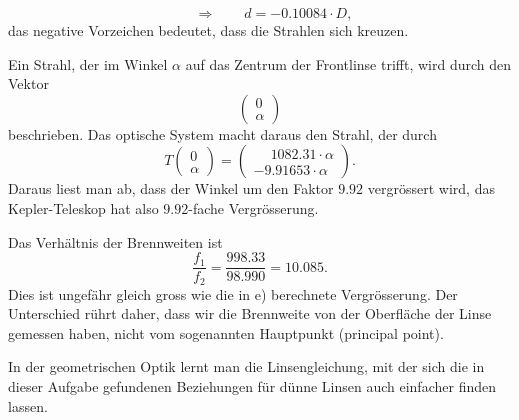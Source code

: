\begin{loesung}
\begin{teilaufgaben}
\[\qquad\Rightarrow\qquad
d = -0.10084\cdot D,
\]
das negative Vorzeichen bedeutet, dass die Strahlen sich kreuzen.
\item
Ein Strahl, der im Winkel $\alpha$ auf das Zentrum der Frontlinse trifft,
wird durch den Vektor
\[
\begin{pmatrix}0\\\alpha \end{pmatrix}
\]
beschrieben.
Das optische System macht daraus den Strahl, der durch
\[
T\begin{pmatrix}0\\\alpha\end{pmatrix}
=
\begin{pmatrix}
\phantom{-}
1082.31\cdot \alpha 
\\
-9.91653\cdot \alpha
\end{pmatrix}.
\]
Daraus liest man ab, dass der Winkel um den Faktor $9.92$ vergrössert
wird, das Kepler-Teleskop hat also $9.92$-fache Vergrösserung.
\item
Das Verhältnis der Brennweiten ist
\[
\frac{f_1}{f_2}
=
\frac{998.33}{98.990}
=
10.085.
\]
Dies ist ungefähr gleich gross wie die in e) berechnete Vergrösserung.
Der Unterschied rührt daher, dass wir die Brennweite von der Oberfläche
der Linse gemessen haben, nicht vom sogenannten Hauptpunkt
(principal point).
\qedhere
\end{teilaufgaben}
\end{loesung}

\begin{diskussion}
In der geometrischen Optik lernt man die Linsengleichung, mit der
sich die in dieser Aufgabe gefundenen Beziehungen für dünne Linsen
auch einfacher finden lassen.
\end{diskussion}
